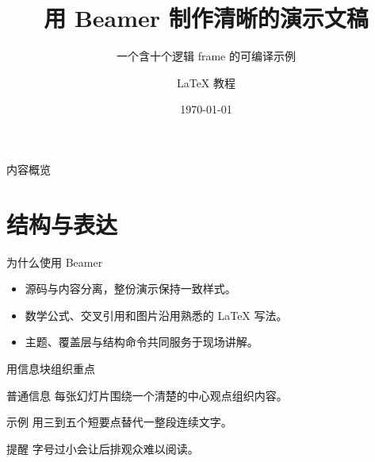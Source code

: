 \documentclass[aspectratio=169,11pt]{beamer}
\title{用 Beamer 制作清晰的演示文稿}
\subtitle{一个含十个逻辑 frame 的可编译示例}
\author{LaTeX 教程}
\institute{VS Code + LaTeX Workshop}
\date{\today}
\begin{document}
\begin{frame}[plain]
    \titlepage
\end{frame}

\begin{frame}{内容概览}
    \tableofcontents
\end{frame}

\section{结构与表达}

\begin{frame}{为什么使用 Beamer}
    \begin{itemize}
        \item 源码与内容分离，整份演示保持一致样式。
        \item 数学公式、交叉引用和图片沿用熟悉的 LaTeX 写法。
        \item 主题、覆盖层与结构命令共同服务于现场讲解。
    \end{itemize}
\end{frame}

\begin{frame}{用信息块组织重点}
    \begin{block}{普通信息}
        每张幻灯片围绕一个清楚的中心观点组织内容。
    \end{block}
    \begin{exampleblock}{示例}
        用三到五个短要点替代一整段连续文字。
    \end{exampleblock}
    \begin{alertblock}{提醒}
        字号过小会让后排观众难以阅读。
    \end{alertblock}
\end{frame}

\end{document}
